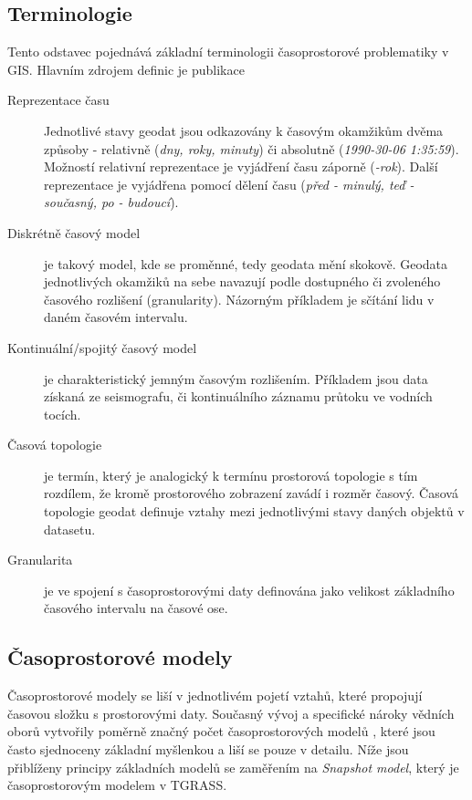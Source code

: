 \documentclass[a4paper,12pt,oneside]{report}
\begin{document}
\subsection{Terminologie}
\label{subsec:terminologie}
Tento odstavec pojednává základní terminologii časoprostorové
problematiky v GIS. Hlavním zdrojem  definic je publikace
\cite{pelekis}
\begin{description}
\item[Reprezentace času] Jednotlivé stavy geodat jsou odkazovány k
  časovým okamžikům dvěma způsoby - relativně (\textit{dny, roky,
    minuty}) či absolutně (\textit{1990-30-06 1:35:59}). Možností
  relativní reprezentace je vyjádření času záporně
  (\textit{-rok}). Další reprezentace je vyjádřena pomocí 
  dělení času (\textit {před - minulý, teď - současný, po - budoucí}).

\item[Diskrétně časový model] je takový model, kde se proměnné, tedy
  geodata mění skokově. Geodata jednotlivých okamžiků na sebe navazují
  podle dostupného či zvoleného časového
  rozlišení (granularity). Názorným příkladem je sčítání lidu v daném časovém
  intervalu.

\item[Kontinuální/spojitý časový model] je charakteristický 
  jemným časovým rozlišením. Příkladem jsou data získaná ze
  seismografu, či kontinuálního záznamu průtoku ve vodních tocích.

\item[Časová topologie] je termín, který je analogický k termínu
  prostorová topologie s tím rozdílem, že kromě prostorového zobrazení zavádí i rozměr časový. Časová topologie geodat definuje vztahy
  mezi jednotlivými stavy daných objektů v datasetu.

\item[Granularita] je ve spojení s časoprostorovými daty definována
  jako velikost základního časového intervalu na časové
  ose. 
\end{description}

\subsection{Časoprostorové modely}

Časoprostorové modely se liší v jednotlivém pojetí vztahů, které
propojují časovou složku s prostorovými daty. Současný vývoj a
specifické nároky vědních oborů vytvořily poměrně značný počet 
časoprostorových modelů \cite{pelekis}, které jsou často sjednoceny
základní myšlenkou a liší se pouze v detailu. Níže jsou přiblíženy
principy základních modelů se zaměřením na \textit{Snapshot model},
který je časoprostorovým modelem v TGRASS.
\end{document}
